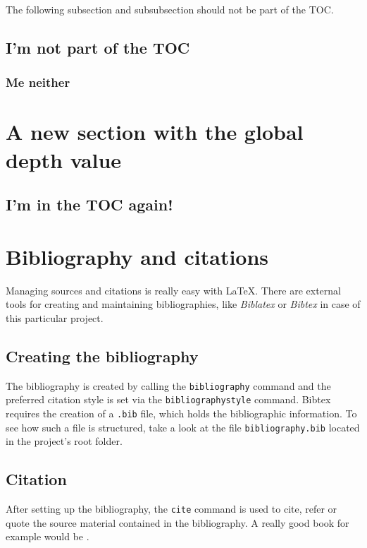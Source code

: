 \documentclass{article}
\begin{document}
The following subsection and subsubsection should not be part of the TOC.

\subsection{I'm not part of the TOC}

\subsubsection{Me neither}


\section{A new section with the global depth value}

\subsection{I'm in the TOC again!}

\section{Bibliography and citations}

Managing sources and citations is really easy with \LaTeX. There are external
tools for creating and maintaining bibliographies, like \textit{Biblatex} or
\textit{Bibtex} in case of this particular project.

\subsection{Creating the bibliography}

The bibliography is created by calling the \texttt{bibliography} command and the
preferred citation style is set via the \texttt{bibliographystyle} command.
Bibtex requires the creation of a \texttt{.bib} file, which holds the
bibliographic information. To see how such a file is structured, take a look at
the file \texttt{bibliography.bib} located in the project's root folder.

\subsection{Citation}

After setting up the bibliography, the \texttt{cite} command is used to cite,
refer or quote the source material contained in the bibliography. A really good
book for example would be \autocite{mindstorms}.
\end{document}
